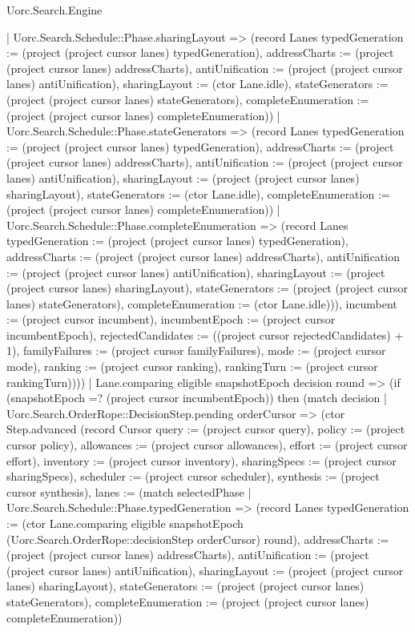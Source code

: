 \begin{lexlean}{Uorc.Search.Engine}
\begin{semanticmodule}
{{        | Uorc.Search.Schedule::Phase.sharingLayout => (record Lanes {typedGeneration := (project (project cursor lanes) typedGeneration), addressCharts := (project (project cursor lanes) addressCharts), antiUnification := (project (project cursor lanes) antiUnification), sharingLayout := (ctor Lane.idle), stateGenerators := (project (project cursor lanes) stateGenerators), completeEnumeration := (project (project cursor lanes) completeEnumeration)})
        | Uorc.Search.Schedule::Phase.stateGenerators => (record Lanes {typedGeneration := (project (project cursor lanes) typedGeneration), addressCharts := (project (project cursor lanes) addressCharts), antiUnification := (project (project cursor lanes) antiUnification), sharingLayout := (project (project cursor lanes) sharingLayout), stateGenerators := (ctor Lane.idle), completeEnumeration := (project (project cursor lanes) completeEnumeration)})
        | Uorc.Search.Schedule::Phase.completeEnumeration => (record Lanes {typedGeneration := (project (project cursor lanes) typedGeneration), addressCharts := (project (project cursor lanes) addressCharts), antiUnification := (project (project cursor lanes) antiUnification), sharingLayout := (project (project cursor lanes) sharingLayout), stateGenerators := (project (project cursor lanes) stateGenerators), completeEnumeration := (ctor Lane.idle)})), incumbent := (project cursor incumbent), incumbentEpoch := (project cursor incumbentEpoch), rejectedCandidates := ((project cursor rejectedCandidates) + 1), familyFailures := (project cursor familyFailures), mode := (project cursor mode), ranking := (project cursor ranking), rankingTurn := (project cursor rankingTurn)})))
    | Lane.comparing eligible snapshotEpoch decision round => (if (snapshotEpoch =? (project cursor incumbentEpoch)) then (match decision
      | Uorc.Search.OrderRope::DecisionStep.pending orderCursor => (ctor Step.advanced (record Cursor {query := (project cursor query), policy := (project cursor policy), allowances := (project cursor allowances), effort := (project cursor effort), inventory := (project cursor inventory), sharingSpecs := (project cursor sharingSpecs), scheduler := (project cursor scheduler), synthesis := (project cursor synthesis), lanes := (match selectedPhase
        | Uorc.Search.Schedule::Phase.typedGeneration => (record Lanes {typedGeneration := (ctor Lane.comparing eligible snapshotEpoch (Uorc.Search.OrderRope::decisionStep orderCursor) round), addressCharts := (project (project cursor lanes) addressCharts), antiUnification := (project (project cursor lanes) antiUnification), sharingLayout := (project (project cursor lanes) sharingLayout), stateGenerators := (project (project cursor lanes) stateGenerators), completeEnumeration := (project (project cursor lanes) completeEnumeration)})
}}
\end{semanticmodule}
\end{lexlean}
